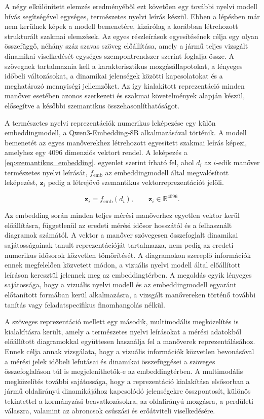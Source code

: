 \documentclass[12pt,a4paper,onehalfspacing, oneside]{book} %
\begin{document}
A négy elkülönített elemzés eredményéből ezt követően egy további nyelvi modell hívás segítségével egységes, természetes nyelvi leírás készül. Ebben a lépésben már nem kerülnek képek a modell bemenetére, kizárólag a korábban létrehozott strukturált szakmai elemzések. Az egyes részleírások egyesítésének célja egy olyan összefüggő, néhány száz szavas szöveg előállítása, amely a jármű teljes vizsgált dinamikai viselkedését egységes szempontrendszer szerint foglalja össze. A szövegnek tartalmaznia kell a karakterisztikus mozgásállapotokat, a lényeges időbeli változásokat, a dinamikai jelenségek közötti kapcsolatokat és a meghatározó mennyiségi jellemzőket. Az így kialakított reprezentáció minden manőver esetében azonos szerkezeti és szakmai követelmények alapján készül, elősegítve a későbbi szemantikus összehasonlíthatóságot.

A természetes nyelvi reprezentációk numerikus leképezése egy külön embeddingmodell, a Qwen3-Embedding-8B alkalmazásával történik. A modell bemenetét az egyes manőverekhez létrehozott egyesített szakmai leírás képezi, amelyhez egy $4096$ dimenziós vektort rendel. A leképezés a \ref{eq:szemantikus_embedding}. egyenlet szerint írható fel, ahol $d_i$ az $i$-edik manőver természetes nyelvi leírását, $f_{\mathrm{emb}}$ az embeddingmodell által megvalósított leképezést, $\mathbf{z}_i$ pedig a létrejövő szemantikus vektorreprezentációt jelöli.

\begin{equation}
\mathbf{z}_i = f_{\mathrm{emb}}(d_i), \qquad \mathbf{z}_i \in \mathbb{R}^{4096}.
\label{eq:szemantikus_embedding}
\end{equation}

Az embedding során minden teljes mérési manőverhez egyetlen vektor kerül előállításra, függetlenül az eredeti mérési idősor hosszától és a felhasznált diagramok számától. A vektor a manőver szövegesen összefoglalt dinamikai sajátosságainak tanult reprezentációját tartalmazza, nem pedig az eredeti numerikus idősorok közvetlen tömörítését. A diagramokon szereplő információk ennek megfelelően közvetett módon, a vizuális nyelvi modell által előállított leíráson keresztül jelennek meg az embeddingtérben. A megoldás egyik lényeges sajátossága, hogy a vizuális nyelvi modell és az embeddingmodell egyaránt előtanított formában kerül alkalmazásra, a vizsgált manővereken történő további tanítás vagy feladatspecifikus finomhangolás nélkül.

A szöveges reprezentáció mellett egy második, multimodális megközelítés is kialakításra került, amely a természetes nyelvi leírásokat a mérési adatokból előállított diagramokkal együttesen használja fel a manőverek reprezentálásához. Ennek célja annak vizsgálata, hogy a vizuális információk közvetlen bevonásával a mérési jelek időbeli lefutásai és dinamikai összefüggései a szöveges összefoglaláson túl is megjeleníthetők-e az embeddingtérben. A multimodális megközelítés további sajátossága, hogy a reprezentáció kialakítása elsősorban a jármű oldalirányú dinamikájához kapcsolódó jelenségekre összpontosít, különös tekintettel a kormányzási beavatkozásokra, az oldalirányú mozgásra, a perdületi válaszra, valamint az abroncsok csúszási és erőátviteli viselkedésére.
\end{document}
